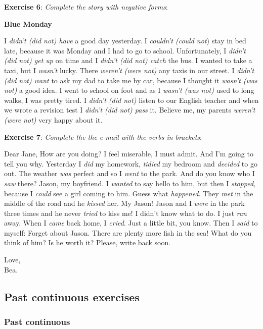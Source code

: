 \textbf{Exercise 6}: \textit{Complete the story with negative forms}:

\textbf{Blue Monday}

I \textit{didn't (did not) have} a good day yesterday. I \textit{couldn't (could not}) stay in bed late, because it was Monday and I had to go to school. Unfortunately, I \textit{didn't (did not) get up} on time and I \textit{didn't (did not) catch} the bus. I wanted to take a taxi, but I \textit{wasn't} lucky. There \textit{weren't (were not)} any taxis in our street.
I \textit{didn't (did not) want} to ask my dad to take me by car, because I thought it \textit{wasn't (was not)} a good idea. I went to school on foot and as I \textit{wasn't (was not)} used to long walks, I was pretty tired. I \textit{didn't (did not)} listen to our English teacher and when we wrote a revision 
test I \textit{didn't (did not) pass} it. Believe me, my parents \textit{weren't (were not)} very happy about it.


\textbf{Exercise 7}: \textit{Complete the the e-mail with the verbs in brackets}:

Dear Jane,
How are you doing? I feel miserable, I must admit. And I'm going to tell you why.
Yesterday I \textit{did} my homework, \textit{tidied} my bedroom and \textit{decided} to go out. The weather \textit{was} perfect and so I \textit{went} to the park. And 
do you know who I \textit{saw} there? Jason, my boyfriend. I \textit{wanted} to say hello to him, but then I \textit{stopped}, because I \textit{could} see a girl coming to him. Guess what \textit{happened}. They \textit{met} in the middle of the road and he \textit{kissed} her. My Jason! Jason and I \textit{were} in the park three times and he never \textit{tried} to kiss me! I didn't know what to do. I just \textit{ran} away. When I \textit{came} back home, I \textit{cried}. Just a little bit, you know. Then I \textit{said} to myself: Forget about Jason. There are plenty more fish in the sea! What do you think of him? Is he worth it? Please, write back soon.

\begin{flushleft}
Love,\\
Bea.
\end{flushleft}

\subsection{Past continuous exercises}

\subsubsection{Past continuous}

